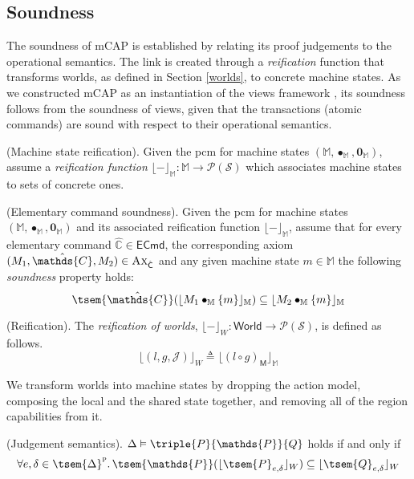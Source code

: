 \subsection{Soundness}

The soundness of mCAP is established by relating its proof judgements to the operational semantics. The link is created through a \textit{reification} function that transforms worlds, as defined in Section \ref{worlds}, to concrete machine states. As we constructed mCAP as an instantiation of the views framework \cite{views}, its soundness follows from the soundness of views, given that the transactions (atomic commands) are sound with respect to their operational semantics.

\begin{param}
	(Machine state reification).
	Given the pcm for machine states $(\mathbb{M}, \bullet_\mathbb{M}, \mathbf{0}_\mathbb{M})$, assume a \emph{reification function} $\lfloor - \rfloor_\mathbb{M} : \mathbb{M} \rightarrow \mathcal{P}(\mathcal{S})$ which associates machine states to sets of concrete ones.
\end{param}

\begin{param}
	\label{param:ecmdSound}
	(Elementary command soundness).
	Given the pcm for machine states $(\mathbb{M}, \bullet_\mathbb{M}, \mathbf{0}_\mathbb{M})$ and its associated reification function $\lfloor - \rfloor_\mathbb{M}$, assume that for every elementary command $\hat{\mathds{C}} \in \mathsf{ECmd}$, the corresponding axiom $(M_1, \hat{\mathds{C}}, M_2) \in \textsc{Ax}_{\hat{\mathsf{C}}}$ and any given machine state $m \in \mathbb{M}$ the following \emph{soundness} property holds:
	\[
		\tsem{\hat{\mathds{C}}}(\lfloor M_1 \bullet_\mathbb{M} \{m\} \rfloor_\mathbb{M}) \subseteq \lfloor M_2 \bullet_\mathbb{M} \{m\} \rfloor_\mathbb{M}
	\]
\end{param}

\begin{defn}
	(Reification).
	The \emph{reification of worlds}, $\lfloor - \rfloor_W : \mathsf{World} \rightarrow \mathcal{P}(\mathcal{S})$, is defined as follows.
	\[
		\lfloor (l, g, \mathcal{J}) \rfloor_W \triangleq \lfloor (l \circ g)_\mathsf{M} \rfloor_\mathbb{M}
	\]
\end{defn}
We transform worlds into machine states by dropping the action model, composing the local and the shared state together, and removing all of the region capabilities from it.

\begin{defn}
	(Judgement semantics).
	$\Delta \vDash \triple{P}{\mathds{P}}{Q}$ holds if and only if
	\[
		\forall e, \delta \in \tsem{\Delta}^\textsc{p} \ldotp \tsem{\mathds{P}}(\lfloor \tsem{P}_{e, \delta} \rfloor_W) \subseteq \lfloor \tsem{Q}_{e, \delta} \rfloor_W
	\]
\end{defn}

